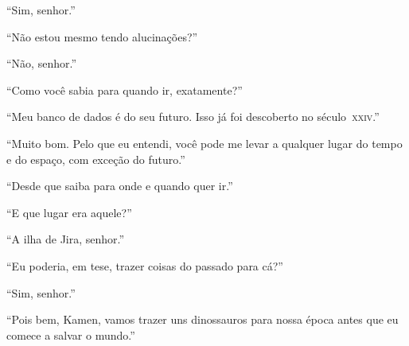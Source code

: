 “Sim, senhor.”

“Não estou mesmo tendo alucinações?”

“Não, senhor.”

“Como você sabia para quando ir, exatamente?”

“Meu banco de dados é do seu futuro. Isso já foi descoberto no
século~\textsc{xxiv}.”

“Muito bom. Pelo que eu entendi, você pode me levar a qualquer lugar do
tempo e do espaço, com exceção do futuro.”

“Desde que saiba para onde e quando quer ir.”

“E que lugar era aquele?”

“A ilha de Jira, senhor.”

“Eu poderia, em tese, trazer coisas do passado para cá?”

“Sim, senhor.”

“Pois bem, Kamen, vamos trazer uns dinossauros para nossa época antes
que eu comece a salvar o mundo.”
